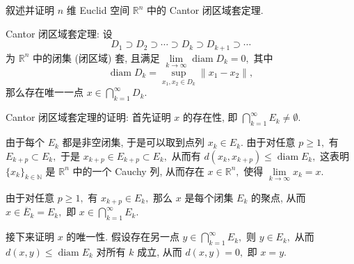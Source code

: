 \begin{question}[points = 10]
  叙述并证明 $n$ 维 Euclid 空间 $\mathbb{R}^n$ 中的 Cantor 闭区域套定理.

\end{question}

\begin{solution}
  Cantor 闭区域套定理: 设
  $$D_1 \supset D_2 \supset \cdots \supset D_k \supset D_{k+1} \supset \cdots$$
  为 $\mathbb{R}^n$ 中的闭集 (闭区域) 套, 且满足 $\lim\limits_{k \to \infty} \operatorname{diam} D_k = 0,$ 其中
  $$\operatorname{diam} D_k = \sup\limits_{x_1, x_2 \in D_k} \lVert x_1 - x_2 \rVert,$$
  那么存在唯一一点 $x \in \bigcap\limits_{k=1}^\infty D_k.$

  Cantor 闭区域套定理的证明: 首先证明 $x$ 的存在性, 即 $\bigcap\limits_{k=1}^{\infty} E_k \neq \emptyset.$

  由于每个 $E_k$ 都是非空闭集, 于是可以取到点列 $x_k \in E_k.$ 由于对任意 $p \geqslant 1,$ 有 $E_{k+p} \subset E_k,$ 于是 $x_{k+p} \in E_{k+p} \subset E_k,$ 从而有 $d(x_k, x_{k+p}) \leqslant \operatorname{diam} E_k,$ 这表明 $\{ x_k \}_{k\in\mathbb{N}}$ 是 $\mathbb{R}^n$ 中的一个 Cauchy 列, 从而存在 $x \in \mathbb{R}^n,$ 使得 $\lim\limits_{k\to\infty} x_k = x.$

  由于对任意 $p \geqslant 1,$ 有 $x_{k+p} \in E_k,$ 那么 $x$ 是每个闭集 $E_k$ 的聚点, 从而 $x \in \overline{E}_k = E_k,$ 即 $x \in \bigcap\limits_{k=1}^{\infty} E_k.$

  接下来证明 $x$ 的唯一性. 假设存在另一点 $y \in \bigcap\limits_{k=1}^{\infty} E_k,$ 则 $y \in E_k,$ 从而 $d(x, y) \leqslant \operatorname{diam} E_k$ 对所有 $k$ 成立, 从而 $d(x, y) = 0,$ 即 $x = y.$
\end{solution}


